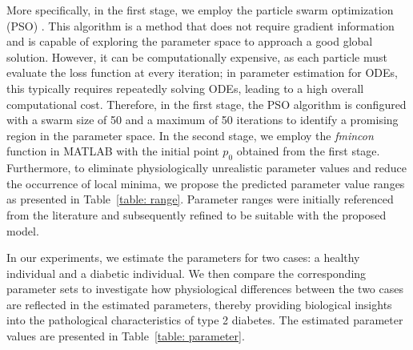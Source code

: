 \documentclass[a4paper,fleqn]{cas-sc}
\numberwithin{equation}{section}
\numberwithin{equation}{section}
\newcommand{\1}{\boldsymbol{1}}
\newcommand{\0}{\boldsymbol{0}}
\begin{document}
More specifically, in the first stage, we employ the particle swarm optimization (PSO) \cite{Gad2022PSOReview}. This algorithm is a method that does not require gradient information and is capable of exploring the parameter space to approach a good global solution. However, it can be computationally expensive, as each particle must evaluate the loss function at every iteration; in parameter estimation for ODEs, this typically requires repeatedly solving ODEs, leading to a high overall computational cost. Therefore, in the first stage, the PSO algorithm is configured with a swarm size of 50 and a maximum of 50 iterations to identify a promising region in the parameter space. In the second stage, we employ the \textit{fmincon} function in MATLAB \cite{Lopez2014MATLABOptimization} with the initial
point $p_0$ obtained from the first stage. Furthermore, to eliminate physiologically unrealistic parameter values and reduce the occurrence of local minima, we propose the predicted parameter value ranges as presented in Table~\ref{table: range}. Parameter ranges were initially referenced from the literature \cite{GallardoHernandez2022MinimalModel,Kelly2019GlucagonModel} and subsequently refined to be suitable with the proposed model.

In our experiments, we estimate the parameters for two cases: a healthy individual and a diabetic individual. We then compare the corresponding parameter sets to investigate how physiological differences between the two cases are reflected in the estimated parameters, thereby providing biological insights into the pathological characteristics of type 2 diabetes. The estimated parameter values are presented in Table~\ref{table: parameter}.
\end{document}
